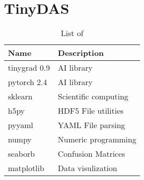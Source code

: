 \section{TinyDAS}
\label{app:tinypacks}

\begin{table}[h]
\centering
\begin{tabular}{|l|l|}
\hline
\textbf{Name}  & \textbf{Description}         \\ \hline
tinygrad 0.9          & AI library            \\ \hline
pytorch 2.4          & AI library             \\ \hline
sklearn       & Scientific computing         \\ \hline
h5py           & HDF5 File utilities          \\ \hline
pyyaml         & YAML File parsing            \\ \hline
numpy          & Numeric programming          \\ \hline
seaborb        & Confusion Matrices\\ \hline
matplotlib     & Data visulization \\ \hline
\end{tabular}
\caption{List of }
\end{table}